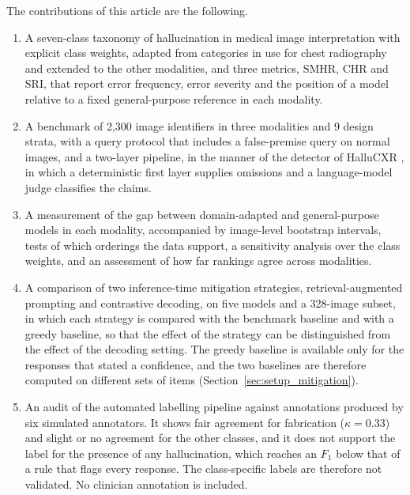 \documentclass[11pt,a4paper]{article}
\providecommand{\Nimages}{2{,}300}
\providecommand{\Nstrata}{9}
\newcommand{\SMHR}{\ensuremath{\mathrm{SMHR}}}
\newcommand{\CHR}{\ensuremath{\mathrm{CHR}}}
\newcommand{\SRI}{\ensuremath{\mathrm{SRI}}}
\begin{document}
The contributions of this article are the following.
\begin{enumerate}
  \item A seven-class taxonomy of hallucination in medical image interpretation with explicit class weights, adapted from categories in use for chest radiography and extended to the other modalities, and three metrics, \SMHR, \CHR{} and \SRI, that report error frequency, error severity and the position of a model relative to a fixed general-purpose reference in each modality.
  \item A benchmark of \Nimages{} image identifiers in three modalities and \Nstrata{} design strata, with a query protocol that includes a false-premise query on normal images, and a two-layer pipeline, in the manner of the detector of HalluCXR \citep{wang2026hallucxr}, in which a deterministic first layer supplies omissions and a language-model judge classifies the claims.
  \item A measurement of the gap between domain-adapted and general-purpose models in each modality, accompanied by image-level bootstrap intervals, tests of which orderings the data support, a sensitivity analysis over the class weights, and an assessment of how far rankings agree across modalities.
  \item A comparison of two inference-time mitigation strategies, retrieval-augmented prompting and contrastive decoding, on five models and a 328-image subset, in which each strategy is compared with the benchmark baseline and with a greedy baseline, so that the effect of the strategy can be distinguished from the effect of the decoding setting. The greedy baseline is available only for the responses that stated a confidence, and the two baselines are therefore computed on different sets of items (Section~\ref{sec:setup_mitigation}).
  \item An audit of the automated labelling pipeline against annotations produced by six simulated annotators. It shows fair agreement for fabrication ($\kappa = 0.33$) and slight or no agreement for the other classes, and it does not support the label for the presence of any hallucination, which reaches an $F_1$ below that of a rule that flags every response. The class-specific labels are therefore not validated. No clinician annotation is included.
\end{enumerate}
\end{document}
